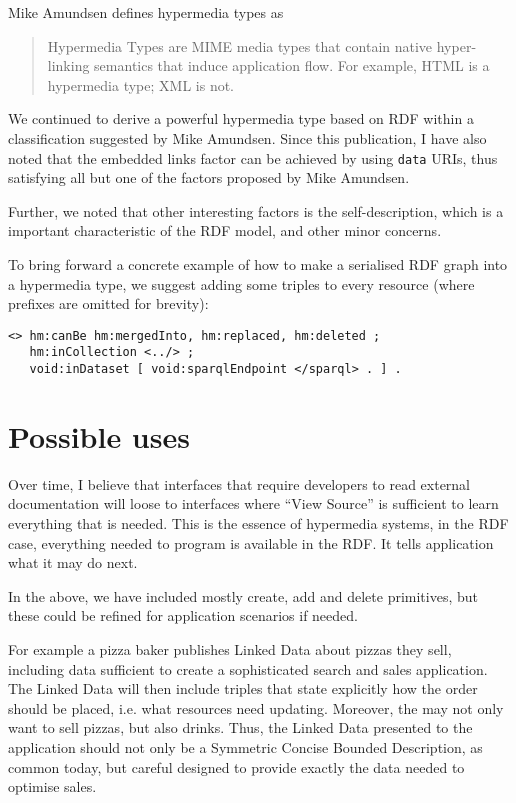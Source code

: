 \documentclass{article}
\begin{document}
Mike Amundsen defines hypermedia types\cite{hypermediatypes} as 
\begin{quote}
Hypermedia Types are MIME media types that contain native
hyper-linking semantics that induce application flow. For example,
HTML is a hypermedia type; XML is not.
\end{quote}

We continued to derive a powerful hypermedia type based on RDF within
a classification suggested by Mike Amundsen. Since this publication, I
have also noted that the embedded links factor can be achieved by
using \texttt{data} URIs, thus satisfying all but one of the factors
proposed by Mike Amundsen.

Further, we noted that other interesting factors is the
self-description, which is a important characteristic of the RDF
model, and other minor concerns.

To bring forward a concrete example of how to make a serialised RDF
graph into a hypermedia type, we suggest adding some triples to every
resource (where prefixes are omitted for brevity):

\begin{verbatim}
<> hm:canBe hm:mergedInto, hm:replaced, hm:deleted ;
   hm:inCollection <../> ;
   void:inDataset [ void:sparqlEndpoint </sparql> . ] .
\end{verbatim}

\section{Possible uses}

Over time, I believe that interfaces that require developers to read
external documentation will loose to interfaces where ``View Source''
is sufficient to learn everything that is needed. This is the essence
of hypermedia systems, in the RDF case, everything needed to program
is available in the RDF. It tells application what it may do next.

In the above, we have included mostly create, add and delete
primitives, but these could be refined for application scenarios if
needed.

For example a pizza baker publishes Linked Data about pizzas they
sell, including data sufficient to create a sophisticated search and
sales application. The Linked Data will then include triples that
state explicitly how the order should be placed, i.e. what resources
need updating. Moreover, the may not only want to sell pizzas, but
also drinks. Thus, the Linked Data presented to the application should
not only be a Symmetric Concise Bounded Description, as common today,
but careful designed to provide exactly the data needed to optimise
sales.


%
%

\end{document}
